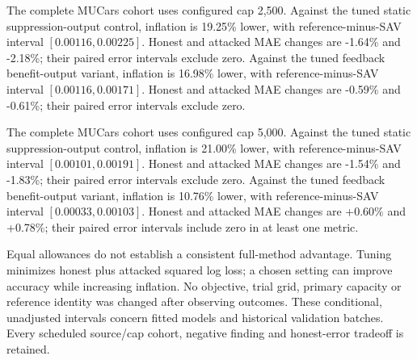 The complete MUCars cohort uses configured cap 2,500. Against the tuned static suppression-output control, inflation is 19.25\% lower, with reference-minus-SAV interval $[0.00116,0.00225]$. Honest and attacked MAE changes are -1.64\% and -2.18\%; their paired error intervals exclude zero. Against the tuned feedback benefit-output variant, inflation is 16.98\% lower, with reference-minus-SAV interval $[0.00116,0.00171]$. Honest and attacked MAE changes are -0.59\% and -0.61\%; their paired error intervals exclude zero.

The complete MUCars cohort uses configured cap 5,000. Against the tuned static suppression-output control, inflation is 21.00\% lower, with reference-minus-SAV interval $[0.00101,0.00191]$. Honest and attacked MAE changes are -1.54\% and -1.83\%; their paired error intervals exclude zero. Against the tuned feedback benefit-output variant, inflation is 10.76\% lower, with reference-minus-SAV interval $[0.00033,0.00103]$. Honest and attacked MAE changes are +0.60\% and +0.78\%; their paired error intervals include zero in at least one metric.

Equal allowances do not establish a consistent full-method advantage. Tuning minimizes honest plus attacked squared log loss; a chosen setting can improve accuracy while increasing inflation. No objective, trial grid, primary capacity or reference identity was changed after observing outcomes. These conditional, unadjusted intervals concern fitted models and historical validation batches. Every scheduled source/cap cohort, negative finding and honest-error tradeoff is retained.
